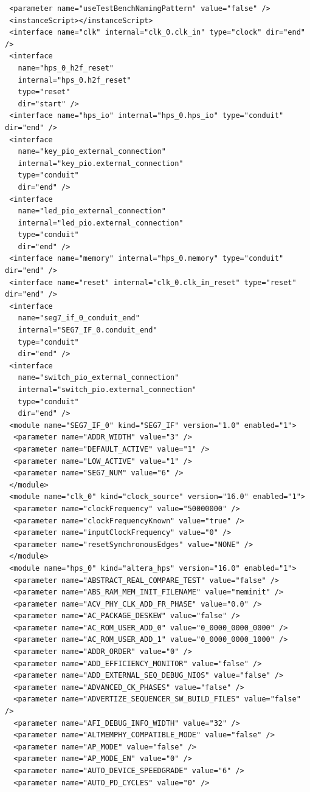 \documentclass[conference]{IEEEtran}
\begin{document}
\begin{lstlisting}
 <parameter name="useTestBenchNamingPattern" value="false" />
 <instanceScript></instanceScript>
 <interface name="clk" internal="clk_0.clk_in" type="clock" dir="end" />
 <interface
   name="hps_0_h2f_reset"
   internal="hps_0.h2f_reset"
   type="reset"
   dir="start" />
 <interface name="hps_io" internal="hps_0.hps_io" type="conduit" dir="end" />
 <interface
   name="key_pio_external_connection"
   internal="key_pio.external_connection"
   type="conduit"
   dir="end" />
 <interface
   name="led_pio_external_connection"
   internal="led_pio.external_connection"
   type="conduit"
   dir="end" />
 <interface name="memory" internal="hps_0.memory" type="conduit" dir="end" />
 <interface name="reset" internal="clk_0.clk_in_reset" type="reset" dir="end" />
 <interface
   name="seg7_if_0_conduit_end"
   internal="SEG7_IF_0.conduit_end"
   type="conduit"
   dir="end" />
 <interface
   name="switch_pio_external_connection"
   internal="switch_pio.external_connection"
   type="conduit"
   dir="end" />
 <module name="SEG7_IF_0" kind="SEG7_IF" version="1.0" enabled="1">
  <parameter name="ADDR_WIDTH" value="3" />
  <parameter name="DEFAULT_ACTIVE" value="1" />
  <parameter name="LOW_ACTIVE" value="1" />
  <parameter name="SEG7_NUM" value="6" />
 </module>
 <module name="clk_0" kind="clock_source" version="16.0" enabled="1">
  <parameter name="clockFrequency" value="50000000" />
  <parameter name="clockFrequencyKnown" value="true" />
  <parameter name="inputClockFrequency" value="0" />
  <parameter name="resetSynchronousEdges" value="NONE" />
 </module>
 <module name="hps_0" kind="altera_hps" version="16.0" enabled="1">
  <parameter name="ABSTRACT_REAL_COMPARE_TEST" value="false" />
  <parameter name="ABS_RAM_MEM_INIT_FILENAME" value="meminit" />
  <parameter name="ACV_PHY_CLK_ADD_FR_PHASE" value="0.0" />
  <parameter name="AC_PACKAGE_DESKEW" value="false" />
  <parameter name="AC_ROM_USER_ADD_0" value="0_0000_0000_0000" />
  <parameter name="AC_ROM_USER_ADD_1" value="0_0000_0000_1000" />
  <parameter name="ADDR_ORDER" value="0" />
  <parameter name="ADD_EFFICIENCY_MONITOR" value="false" />
  <parameter name="ADD_EXTERNAL_SEQ_DEBUG_NIOS" value="false" />
  <parameter name="ADVANCED_CK_PHASES" value="false" />
  <parameter name="ADVERTIZE_SEQUENCER_SW_BUILD_FILES" value="false" />
  <parameter name="AFI_DEBUG_INFO_WIDTH" value="32" />
  <parameter name="ALTMEMPHY_COMPATIBLE_MODE" value="false" />
  <parameter name="AP_MODE" value="false" />
  <parameter name="AP_MODE_EN" value="0" />
  <parameter name="AUTO_DEVICE_SPEEDGRADE" value="6" />
  <parameter name="AUTO_PD_CYCLES" value="0" />

\end{lstlisting}
\end{document}
